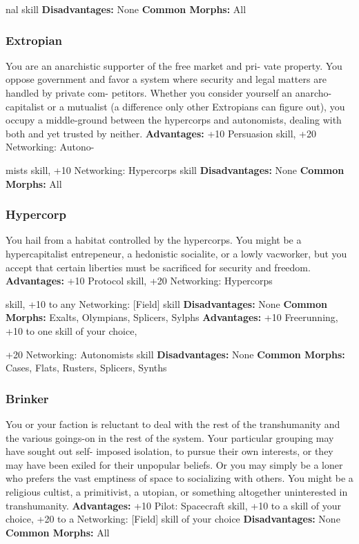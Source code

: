 nal skill
\textbf{Disadvantages:} None
\textbf{Common Morphs:} All

\subsubsection{Extropian}

You are an anarchistic supporter of the free market and pri-
vate property. You oppose government and favor a system 
where security and legal matters are handled by private com-
petitors. Whether you consider yourself an anarcho-capitalist 
or a mutualist (a difference only other Extropians can figure 
out), you occupy a middle-ground between the hypercorps 
and autonomists, dealing with both and yet trusted by neither.
\textbf{Advantages:} +10 Persuasion skill, +20 Networking: Autono-

mists skill, +10 Networking: Hypercorps skill
\textbf{Disadvantages:} None
\textbf{Common Morphs:} All

\subsubsection{Hypercorp}

You hail from a habitat controlled by the hypercorps. You 
might be a hypercapitalist entrepeneur, a hedonistic socialite, 
or a lowly vacworker, but you accept that certain liberties 
must be sacrificed for security and freedom.
\textbf{Advantages:} +10 Protocol skill, +20 Networking: Hypercorps 

skill, +10 to any Networking: [Field] skill
\textbf{Disadvantages:} None
\textbf{Common Morphs:} Exalts, Olympians, Splicers, Sylphs
\textbf{Advantages:} +10 Freerunning, +10 to one skill of your choice, 

+20 Networking: Autonomists skill
\textbf{Disadvantages:} None
\textbf{Common Morphs:} Cases, Flats, Rusters, Splicers, Synths

\subsubsection{Brinker}

You or your faction is reluctant to deal with the rest of the 
transhumanity and the various goings-on in the rest of the 
system. Your particular grouping may have sought out self-
imposed isolation, to pursue their own interests, or they may 
have been exiled for their unpopular beliefs. Or you may 
simply be a loner who prefers the vast emptiness of space 
to socializing with others. You might be a religious cultist, a 
primitivist, a utopian, or something altogether uninterested 
in transhumanity.
\textbf{Advantages: }+10 Pilot: Spacecraft skill, +10 to a skill of your 
choice, +20 to a Networking: [Field] skill of your choice
\textbf{Disadvantages:} None
\textbf{Common Morphs:} All

